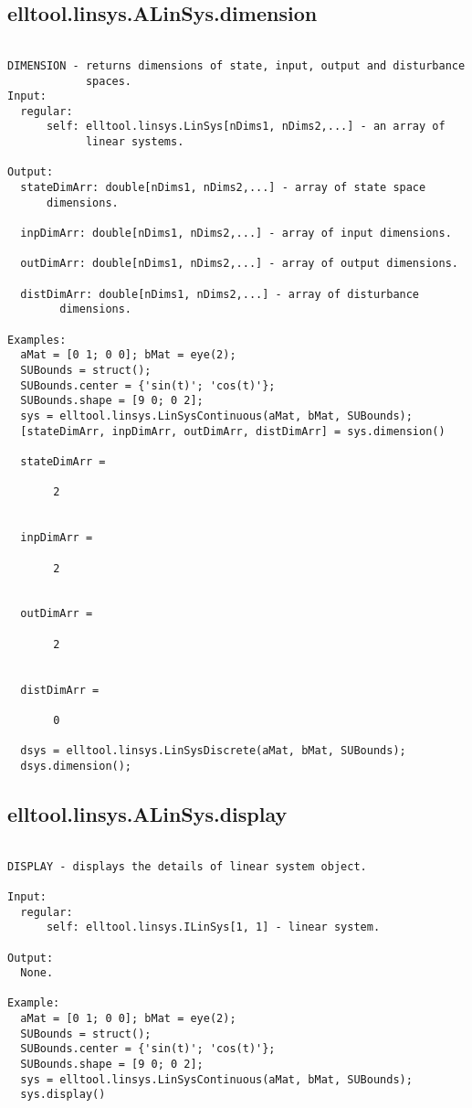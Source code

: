 \subsection{\texorpdfstring{elltool.linsys.ALinSys.dimension}{dimension}}\label{method:elltool.linsys.ALinSys.dimension}
\begin{verbatim}

DIMENSION - returns dimensions of state, input, output and disturbance
            spaces.
Input:
  regular:
      self: elltool.linsys.LinSys[nDims1, nDims2,...] - an array of
            linear systems.

Output:
  stateDimArr: double[nDims1, nDims2,...] - array of state space
      dimensions.

  inpDimArr: double[nDims1, nDims2,...] - array of input dimensions.

  outDimArr: double[nDims1, nDims2,...] - array of output dimensions.

  distDimArr: double[nDims1, nDims2,...] - array of disturbance
        dimensions.

Examples:
  aMat = [0 1; 0 0]; bMat = eye(2);
  SUBounds = struct();
  SUBounds.center = {'sin(t)'; 'cos(t)'};
  SUBounds.shape = [9 0; 0 2];
  sys = elltool.linsys.LinSysContinuous(aMat, bMat, SUBounds);
  [stateDimArr, inpDimArr, outDimArr, distDimArr] = sys.dimension()

  stateDimArr =

       2


  inpDimArr =

       2


  outDimArr =

       2


  distDimArr =

       0

  dsys = elltool.linsys.LinSysDiscrete(aMat, bMat, SUBounds);
  dsys.dimension();
\end{verbatim}
\subsection{\texorpdfstring{elltool.linsys.ALinSys.display}{display}}\label{method:elltool.linsys.ALinSys.display}
\begin{verbatim}

DISPLAY - displays the details of linear system object.

Input:
  regular:
      self: elltool.linsys.ILinSys[1, 1] - linear system.

Output:
  None.

Example:
  aMat = [0 1; 0 0]; bMat = eye(2);
  SUBounds = struct();
  SUBounds.center = {'sin(t)'; 'cos(t)'};
  SUBounds.shape = [9 0; 0 2];
  sys = elltool.linsys.LinSysContinuous(aMat, bMat, SUBounds);
  sys.display()
\end{verbatim}
